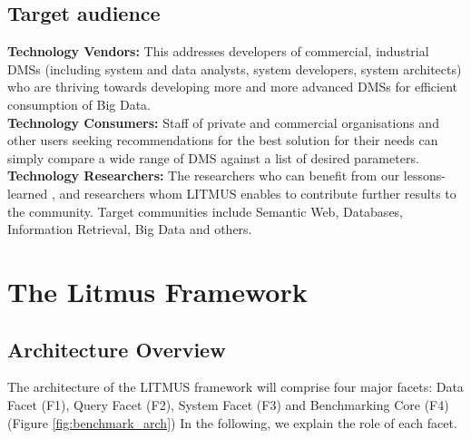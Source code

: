 \documentclass{llncs}
\begin{document}
    \subsection{Target audience}
            \textbf{Technology Vendors:}
            This addresses developers of commercial, industrial DMSs (including system and data analysts, system developers, system architects) who are thriving towards developing more and more advanced DMSs for efficient consumption of Big Data.\\
            \textbf{Technology Consumers:}
            Staff of private and commercial organisations and other users seeking recommendations for the best solution for their needs can simply compare a wide range of DMS against a list of desired parameters. \\
            \textbf{Technology Researchers:}
            The researchers who can benefit from our lessons-learned , and researchers whom LITMUS enables to contribute further results to the community.
            Target communities include Semantic Web, Databases, Information Retrieval, Big Data and others.

\section{The Litmus Framework}\label{litmus_framework}
      \subsection{Architecture Overview}
        The architecture of the LITMUS framework will comprise four major facets: Data Facet (F1), Query Facet (F2), System Facet (F3) and Benchmarking Core (F4) (Figure \ref{fig:benchmark_arch})
        In the following, we explain the role of each facet.
         
\end{document}

